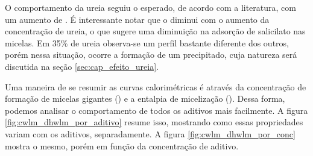 			O comportamento da ureia seguiu o esperado, de acordo com a literatura, com um aumento de \cwlm{}. É interessante notar que o \DHwlm{} diminui com o aumento da concentração de ureia, o que sugere uma diminuição na adsorção de salicilato nas micelas. Em 35\% de ureia observa-se um perfil bastante diferente dos outros, porém nessa situação, ocorre a formação de um precipitado, cuja natureza será discutida na seção \ref{sec:cap_efeito_ureia}.
			
			Uma maneira de se resumir as curvas calorimétricas é através da concentração de formação de micelas gigantes (\cwlm) e a entalpia de micelização (\DHwlm). Dessa forma, podemos analisar o comportamento de todos os aditivos mais facilmente. A figura \ref{fig:cwlm_dhwlm_por_aditivo} resume isso, mostrando como essas propriedades variam com os aditivos, separadamente. A figura \ref{fig:cwlm_dhwlm_por_conc} mostra o mesmo, porém em função da concentração de aditivo.
			
